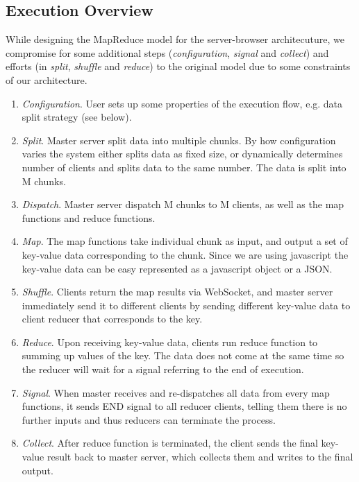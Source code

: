 \subsection{Execution Overview}

While designing the MapReduce model for the server-browser architecuture, we compromise for some additional steps (\emph{configuration}, \emph{signal} and \emph{collect}) and efforts (in \emph{split}, \emph{shuffle} and \emph{reduce}) to the original model due to some constraints of our architecture.

\begin{enumerate}

\item \emph{Configuration}. User sets up some properties of the execution flow, e.g. data split strategy (see below).

\item \emph{Split}. Master server split data into multiple chunks. By how configuration varies the system either splits data as fixed size, or dynamically determines number of clients and splits data to the same number. The data is split into M chunks.

\item \emph{Dispatch}. Master server dispatch M chunks to M clients, as well as the map functions and reduce functions.

\item \emph{Map}. The map functions take individual chunk as input, and output a set of key-value data corresponding to the chunk. Since we are using javascript the key-value data can be easy represented as a javascript object or a JSON.

\item \emph{Shuffle}. Clients return the map results via WebSocket, and master server immediately send it to different clients by sending different key-value data to client reducer that corresponds to the key.

\item \emph{Reduce}. Upon receiving key-value data, clients run reduce function to summing up values of the key. The data does not come at the same time so the reducer will wait for a signal referring to the end of execution.

\item \emph{Signal}. When master receives and re-dispatches all data from every map functions, it sends END signal to all reducer clients, telling them there is no further inputs and thus reducers can terminate the process.

\item \emph{Collect}. After reduce function is terminated, the client sends the final key-value result back to master server, which collects them and writes to the final output.

\end{enumerate}
